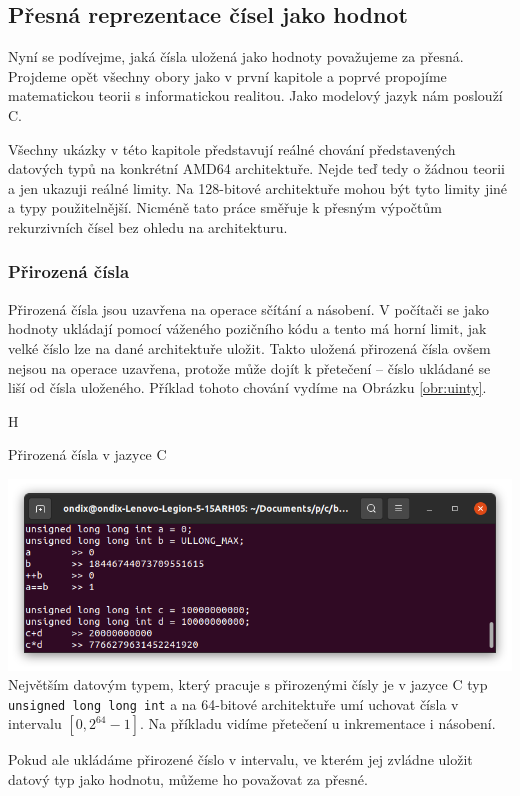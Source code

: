 \subsection{Přesná reprezentace čísel jako hodnot}
Nyní se podívejme, jaká čísla uložená jako hodnoty považujeme za přesná. Projdeme opět všechny obory jako v první kapitole a poprvé propojíme matematickou teorii s informatickou realitou. Jako modelový jazyk nám poslouží C.

Všechny ukázky v této kapitole představují reálné chování představených datových typů na konkrétní AMD64 architektuře. Nejde teď tedy o žádnou teorii a jen ukazuji reálné limity. Na 128-bitové architektuře mohou být tyto limity jiné a typy použitelnější. Nicméně tato práce směřuje k přesným výpočtům rekurzivních čísel bez ohledu na architekturu.

\subsubsection{Přirozená čísla}
Přirozená čísla jsou uzavřena na operace sčítání a násobení. V počítači se jako hodnoty ukládají pomocí váženého pozičního kódu a tento má horní limit, jak velké číslo lze na dané architektuře uložit. Takto uložená přirozená čísla ovšem nejsou na operace uzavřena, protože může dojít k přetečení -- číslo ukládané se liší od čísla uloženého. Příklad tohoto chování vydíme na Obrázku \ref{obr:uinty}.
\begin{myfigure}{H}
\caption{Přirozená čísla v jazyce C}
\includegraphics[width=\linewidth]{./graphics/uinty.png}\label{obr:uinty}
Největším datovým typem, který pracuje s přirozenými čísly je v jazyce C typ \texttt{unsigned long long int} a na 64-bitové architektuře umí uchovat čísla v intervalu $[0, 2^{64}-1]$. Na příkladu vidíme přetečení u inkrementace i násobení.
\end{myfigure}
Pokud ale ukládáme přirozené číslo v intervalu, ve kterém jej zvládne uložit datový typ jako hodnotu, můžeme ho považovat za přesné.

